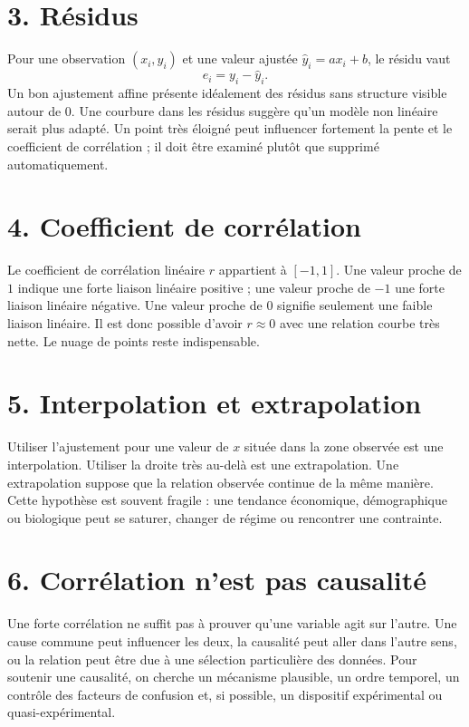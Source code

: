 \section{3. Résidus}
Pour une observation $(x_i,y_i)$ et une valeur ajustée $\hat y_i=ax_i+b$, le résidu vaut
\[
e_i=y_i-\hat y_i.
\]
Un bon ajustement affine présente idéalement des résidus sans structure visible autour de $0$. Une courbure dans les résidus suggère qu'un modèle non linéaire serait plus adapté.
Un point très éloigné peut influencer fortement la pente et le coefficient de corrélation ; il doit être examiné plutôt que supprimé automatiquement.
\section{4. Coefficient de corrélation}
Le coefficient de corrélation linéaire $r$ appartient à $[-1,1]$. Une valeur proche de $1$ indique une forte liaison linéaire positive ; une valeur proche de $-1$ une forte liaison linéaire négative. Une valeur proche de $0$ signifie seulement une faible liaison linéaire.
Il est donc possible d'avoir $r\approx0$ avec une relation courbe très nette. Le nuage de points reste indispensable.
\section{5. Interpolation et extrapolation}
Utiliser l'ajustement pour une valeur de $x$ située dans la zone observée est une interpolation. Utiliser la droite très au-delà est une extrapolation.
Une extrapolation suppose que la relation observée continue de la même manière. Cette hypothèse est souvent fragile : une tendance économique, démographique ou biologique peut se saturer, changer de régime ou rencontrer une contrainte.
\section{6. Corrélation n'est pas causalité}
Une forte corrélation ne suffit pas à prouver qu'une variable agit sur l'autre. Une cause commune peut influencer les deux, la causalité peut aller dans l'autre sens, ou la relation peut être due à une sélection particulière des données.
Pour soutenir une causalité, on cherche un mécanisme plausible, un ordre temporel, un contrôle des facteurs de confusion et, si possible, un dispositif expérimental ou quasi-expérimental.
